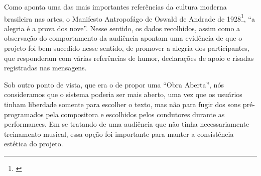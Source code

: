 Como aponta uma das mais importantes referências da cultura moderna brasileira nas artes, o Manifesto Antropofágo de Oswald de Andrade de 1928\footnote{\cite{Andrade1928}}, ``a alegria é a prova dos nove''. Nesse sentido, os dados recolhidos, assim como a observação do comportamento da audiência apontam uma evidência de que o projeto foi bem sucedido nesse sentido, de promover a alegria dos participantes, que responderam com várias referências de humor, declarações de apoio e risadas registradas nas mensagens. 


Sob outro ponto de vista, que era o de propor uma ``Obra Aberta'', nós consideramos que o sistema poderia ser mais aberto, uma vez que os usuários tinham liberdade somente para escolher o texto, mas não para fugir dos sons pré-programados pela compositora e escolhidos pelos condutores durante as performances. Em se tratando de uma audiência que não tinha necessariamente treinamento musical, essa opção foi importante para manter a consistência estética do projeto.






